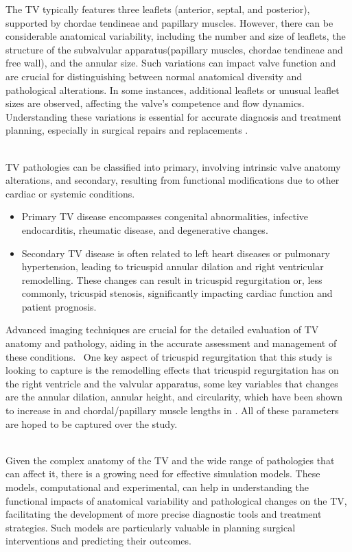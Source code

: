 The \gls{TV} typically features three leaflets (anterior, septal, and posterior), supported by chordae tendineae and papillary muscles. However, there can be considerable anatomical variability, including the number and size of leaflets, the structure of the subvalvular apparatus(papillary muscles, chordae tendineae and free wall), and the annular size. Such variations can impact valve function and are crucial for distinguishing between normal anatomical diversity and pathological alterations. In some instances, additional leaflets or unusual leaflet sizes are observed, affecting the valve's competence and flow dynamics. Understanding these variations is essential for accurate diagnosis and treatment planning, especially in surgical repairs and replacements .~


\\
\gls{TV} pathologies can be classified into primary, involving intrinsic valve anatomy alterations, and secondary, resulting from functional modifications due to other cardiac or systemic conditions.
\begin{itemize}
    \item Primary \gls{TV} disease encompasses congenital abnormalities, infective endocarditis, rheumatic disease, and degenerative changes.
    \item Secondary \gls{TV} disease is often related to left heart diseases or pulmonary hypertension, leading to tricuspid annular dilation and right ventricular remodelling. These changes can result in tricuspid regurgitation or, less commonly, tricuspid stenosis, significantly impacting cardiac function and patient prognosis.
\end{itemize}
Advanced imaging techniques are crucial for the detailed evaluation of \gls{TV} anatomy and pathology, aiding in the accurate assessment and management of these conditions.~ One key aspect of tricuspid regurgitation that this study is looking to capture is the remodelling effects that tricuspid regurgitation has on the right ventricle and the valvular apparatus, some key variables that changes are the annular dilation, annular height, and circularity, which have been shown to increase in  and chordal/papillary muscle lengths in . All of these parameters are hoped to be captured over the study.

\\
Given the complex anatomy of the \gls{TV} and the wide range of pathologies that can affect it, there is a growing need for effective simulation models. These models, computational and experimental, can help in understanding the functional impacts of anatomical variability and pathological changes on the \gls{TV}, facilitating the development of more precise diagnostic tools and treatment strategies. Such models are particularly valuable in planning surgical interventions and predicting their outcomes.


